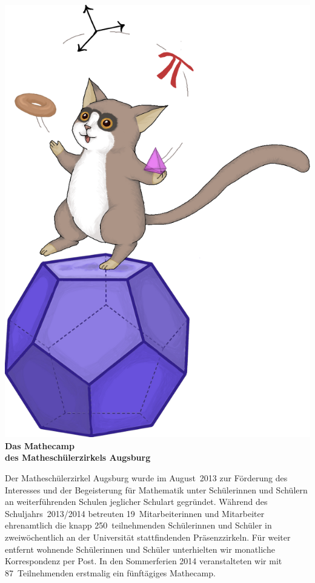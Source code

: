 \documentclass[12pt]{zettel}
\begin{document}
\pagestyle{plain}

\renewcommand{\betreff}{}

\vspace{-2em}

\begin{center}
  {\qquad\quad}\includegraphics[scale=0.18]{cover}\\[1cm]

  \Large\textbf{\textsf{Das Mathecamp \\ des Matheschülerzirkels Augsburg}}
\end{center}

\vspace{1em}

Der Matheschülerzirkel Augsburg wurde im August~2013 zur Förderung des
Interesses und der Begeisterung für Mathematik unter Schülerinnen und Schülern
an weiterführenden Schulen jeglicher Schulart gegründet. Während des Schuljahrs~2013/2014 betreuten
19~Mitarbeiterinnen und Mitarbeiter ehrenamtlich die knapp
250~teilnehmenden Schülerinnen und Schüler in zweiwöchentlich an der
Universität stattfindenden Präsenzzirkeln. Für weiter entfernt wohnende Schülerinnen
und Schüler unterhielten wir monatliche Korrespondenz per Post. In den
Sommerferien 2014 veranstalteten wir mit 87~Teilnehmenden erstmalig ein fünftägiges Mathecamp.
\end{document}
